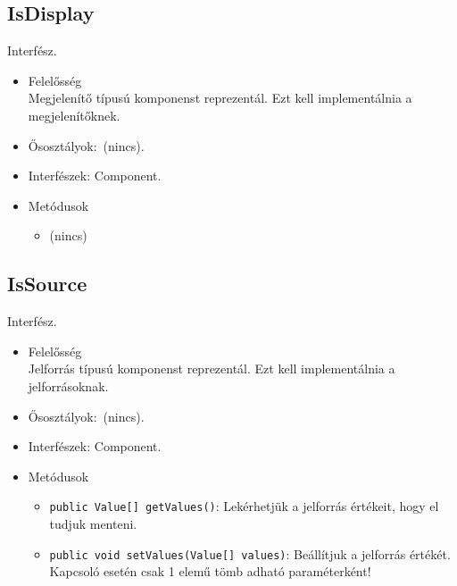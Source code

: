 \subsection{IsDisplay}
Interfész.
\begin{itemize}
\item Felelősség\\
Megjelenítő típusú komponenst reprezentál. Ezt kell implementálnia a megjelenítőknek.
\item Ősosztályok:\ (nincs).
\item Interfészek: Component.
\item Metódusok$\ $
\begin{itemize}
\item (nincs)
\end{itemize}
\end{itemize}

\subsection{IsSource}
Interfész.
\begin{itemize}
\item Felelősség\\
Jelforrás típusú komponenst reprezentál. Ezt kell implementálnia a jelforrásoknak.
\item Ősosztályok:\ (nincs).
\item Interfészek: Component.
\item Metódusok$\ $
\begin{itemize}
	\item \texttt{public Value[] getValues()}: Lekérhetjük a jelforrás értékeit, hogy el tudjuk menteni.
	\item \texttt{public void setValues(Value[] values)}: Beállítjuk a jelforrás értékét. Kapcsoló esetén csak 1 elemű tömb  adható paraméterként!
\end{itemize}
\end{itemize}

